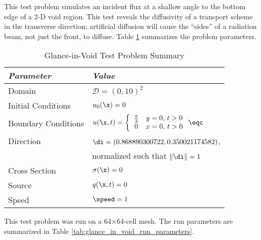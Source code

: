This test problem simulates an incident flux at a shallow angle to
the bottom edge of a 2-D void region.
This test reveals the diffusivity of a transport scheme in the transverse
direction; artificial diffusion will cause the ``sides'' of a radiation beam,
not just the front, to diffuse.
Table \ref{tab:glance_in_void} summarizes the problem parameters.

\begin{table}[htb]\caption{Glance-in-Void Test Problem Summary}
\label{tab:glance_in_void}
\centering
\begin{tabular}{l l}\toprule
\emph{Parameter} & \emph{Value}\\\midrule
Domain & $\mathcal{D} = (0,10)^2$\\
Initial Conditions & $u_0(\x)=0$\\
Boundary Conditions & $u(\x,t)=\left\{\begin{array}{c c}
  \frac{\pi}{3} & y = 0, \, t > 0\\
  0             & x = 0, \, t > 0
  \end{array}\right. \eqc$\\
Direction & $\di = (0.868890300722,0.350021174582)$,\\
          & normalized such that $\|\di\| = 1$\\
Cross Section & $\sigma(\x)=0$\\
Source & $q(\x,t)=0$\\
Speed & $\speed=1$\\
\bottomrule\end{tabular}
\end{table}

This test problem was run on a 64$\times$64-cell mesh.
The run parameters are summarized in Table \ref{tab:glance_in_void_run_parameters}.


